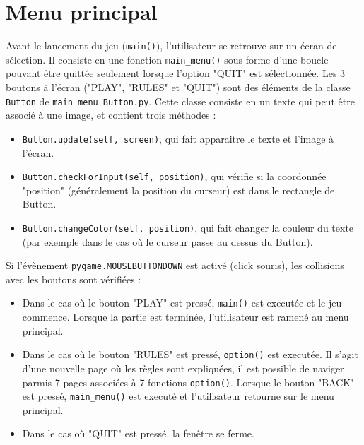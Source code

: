 \documentclass[a4paper,12pt]{article}
\begin{document}
\section{Menu principal}

Avant le lancement du jeu (\texttt{main()}), l'utilisateur se retrouve sur un écran de sélection. Il consiste en une fonction \texttt{main\_menu()} sous forme d'une boucle pouvant être quittée seulement lorsque l'option "QUIT" est sélectionnée.
Les 3 boutons à l'écran ("PLAY", "RULES" et "QUIT") sont des éléments de la classe \texttt{Button} de \texttt{main\_menu\_Button.py}. Cette classe consiste en un texte qui peut être associé à une image, et contient trois méthodes :



\begin{itemize}
  \item \texttt{Button.update(self, screen)}, qui fait apparaitre le texte et l'image à l'écran.
  \item \texttt{Button.checkForInput(self, position)}, qui vérifie si la coordonnée "position" (généralement la position du curseur) est dans le rectangle de Button.
  \item \texttt{Button.changeColor(self, position)}, qui fait changer la couleur du texte (par exemple dans le cas où le curseur passe au dessus du Button).
\end{itemize} 
Si l'évènement \texttt{pygame.MOUSEBUTTONDOWN} est activé (click souris), les collisions avec les boutons sont vérifiées :
\begin{itemize}
  \item Dans le cas où le bouton "PLAY" est pressé, \texttt{main()} est executée et le jeu commence. Lorsque la partie est terminée, l'utilisateur est ramené au menu principal.
  \item Dans le cas où le bouton "RULES" est pressé, \texttt{option()} est executée. Il s'agit d'une nouvelle page où les règles sont expliquées, il est possible de naviger parmis 7 pages associées à 7 fonctions \texttt{option()}. Lorsque le bouton "BACK" est pressé, \texttt{main\_menu()} est executé et l'utilisateur retourne sur le menu principal.
  \item Dans le cas où "QUIT" est pressé, la fenêtre se ferme.
\end{itemize}
\end{document}
